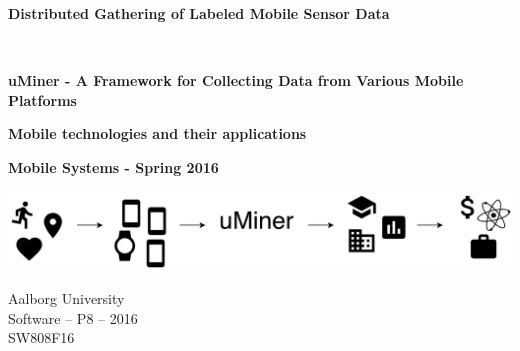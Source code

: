 
\begin{center}
	
	\vspace{8cm}

	\begin{spacing}{2.1}
		\begin{Huge}
			\textbf{Distributed Gathering of Labeled Mobile Sensor Data}
		\end{Huge}
		\\
		\vspace{0.6cm}
		\begin{huge}
			\textbf{uMiner - A Framework for Collecting Data from Various Mobile Platforms}
		\end{huge}
	\end{spacing}

	\vspace{0.6cm}

	\begin{Large}
		\textbf{Mobile technologies and their applications}
	\end{Large}

	\vspace{1cm}

	\begin{large} 
		\textbf{Mobile Systems - Spring 2016}
	\end{large}

	\vspace*{\fill}

	\includegraphics[width=\textwidth]{graphic/miscellaneous/front_page.pdf}

	\vspace*{\fill}

	\vspace*{\fill}

	Aalborg University		\\
	Software -- P8 -- 2016	\\
	SW808F16				\\

\end{center}



\thispagestyle{empty}